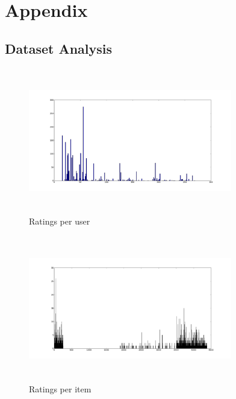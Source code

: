\documentclass{article}
\begin{document}
\newpage
\section{Appendix}
\subsection{Dataset Analysis}

\begin{figure}[H]
\centering
\includegraphics[height=2.5in, width=3.5in]{ratingsperuser.png}
\caption{Ratings per user}
\label{ruser}
\end{figure}

\begin{figure}[H]
\centering
\includegraphics[height=2.5in, width=3.5in]{ratungspermovie.png}
\caption{Ratings per item}
\label{ritem}
\end{figure}



\end{document}
